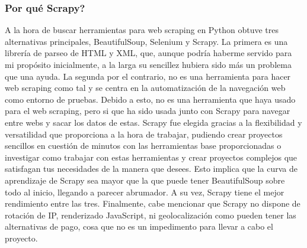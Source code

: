 \subsubsection{Por qué Scrapy?}
A la hora de buscar herramientas para web scraping en Python obtuve tres alternativas principales, BeautifulSoup, Selenium y Scrapy.
\newline
\newline
La primera es una librería de parseo de HTML y XML, que, aunque podría haberme servido para mi propósito inicialmente, a la larga su sencillez hubiera sido más un problema que una ayuda.
\newline
\newline
La segunda por el contrario, no es una herramienta para hacer web scraping como tal y se centra en la automatización de la navegación web como entorno de pruebas. Debido a esto, no es una herramienta que haya usado para el web scraping, pero si que ha sido usada junto con Scrapy para navegar entre webs 
y sacar los datos de estas.
\newline
\newline
Scrapy fue elegida gracias a la flexibilidad y versatilidad que proporciona a la hora de trabajar, pudiendo crear proyectos sencillos en cuestión de minutos con las herramientas base proporcionadas o investigar como trabajar con estas herramientas y crear proyectos complejos que satisfagan tus necesidades de la manera que desees. Esto implica que la curva de aprendizaje de Scrapy sea mayor que la que puede tener BeautifulSoup sobre todo al inicio, llegando a parecer abrumador. A su vez, Scrapy tiene el mejor rendimiento entre las tres. \cite{glez2014web}
\newline
\newline
Finalmente, cabe mencionar que Scrapy no dispone de rotación de IP, renderizado JavaScript, ni geolocalización como pueden tener las alternativas de pago, cosa que no es un impedimento para llevar a cabo el proyecto. 